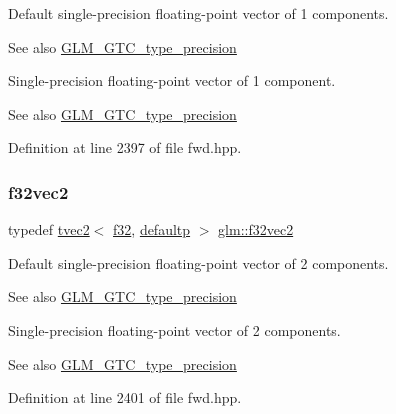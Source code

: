 Default single-\/precision floating-\/point vector of 1 components. \begin{DoxySeeAlso}{See also}
\mbox{\hyperlink{group__gtc__type__precision}{G\+L\+M\+\_\+\+G\+T\+C\+\_\+type\+\_\+precision}}
\end{DoxySeeAlso}
Single-\/precision floating-\/point vector of 1 component. \begin{DoxySeeAlso}{See also}
\mbox{\hyperlink{group__gtc__type__precision}{G\+L\+M\+\_\+\+G\+T\+C\+\_\+type\+\_\+precision}} 
\end{DoxySeeAlso}


Definition at line 2397 of file fwd.\+hpp.

\mbox{\label{group__gtc__type__precision_ga8681dee3524dea86388178c49c27079a}} 
\subsubsection{\texorpdfstring{f32vec2}{f32vec2}}
{\footnotesize\ttfamily typedef \mbox{\hyperlink{structglm_1_1tvec2}{tvec2}}$<$ \mbox{\hyperlink{group__gtc__type__precision_ga0ec999b57f5330d9021256e96038df04}{f32}}, \mbox{\hyperlink{namespaceglm_a0f04f086094c747d227af4425893f545a9d21ccd8b5a009ec7eb7677befc3bf51}{defaultp}} $>$ \mbox{\hyperlink{group__gtc__type__precision_ga8681dee3524dea86388178c49c27079a}{glm\+::f32vec2}}}

Default single-\/precision floating-\/point vector of 2 components. \begin{DoxySeeAlso}{See also}
\mbox{\hyperlink{group__gtc__type__precision}{G\+L\+M\+\_\+\+G\+T\+C\+\_\+type\+\_\+precision}}
\end{DoxySeeAlso}
Single-\/precision floating-\/point vector of 2 components. \begin{DoxySeeAlso}{See also}
\mbox{\hyperlink{group__gtc__type__precision}{G\+L\+M\+\_\+\+G\+T\+C\+\_\+type\+\_\+precision}} 
\end{DoxySeeAlso}


Definition at line 2401 of file fwd.\+hpp.

\mbox{\label{group__gtc__type__precision_gab550330e62a7bc3fa9e6740b9421037c}} 
